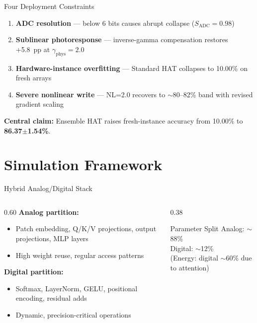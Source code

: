 \documentclass[aspectratio=169,11pt]{beamer}
\begin{document}
\begin{frame}{Four Deployment Constraints}
  \begin{enumerate}
    \item \textbf{ADC resolution} --- below 6 bits causes abrupt collapse ($S_{\text{ADC}} = 0.98$)
    \item \textbf{Sublinear photoresponse} --- inverse-gamma compensation restores +5.8~pp at $\gamma_{\text{phys}} = 2.0$
    \item \textbf{Hardware-instance overfitting} --- Standard HAT collapses to 10.00\% on fresh arrays
    \item \textbf{Severe nonlinear write} --- NL=2.0 recovers to $\sim$80--82\% band with revised gradient scaling
  \end{enumerate}
  \vfill
  \centering
  \textbf{Central claim:} Ensemble HAT raises fresh-instance accuracy from 10.00\% to \textbf{86.37$\pm$1.54\%}.
\end{frame}

\section{Simulation Framework}

\begin{frame}{Hybrid Analog/Digital Stack}
  \begin{columns}
    \begin{column}{0.60\textwidth}
      \textbf{Analog partition:}
      \begin{itemize}
        \item Patch embedding, Q/K/V projections, output projections, MLP layers
        \item High weight reuse, regular access patterns
      \end{itemize}
      \textbf{Digital partition:}
      \begin{itemize}
        \item Softmax, LayerNorm, GELU, positional encoding, residual adds
        \item Dynamic, precision-critical operations
      \end{itemize}
    \end{column}
    \begin{column}{0.38\textwidth}
      \begin{block}{Parameter Split}
        Analog: $\sim$88\%\\
        Digital: $\sim$12\%\\
        (Energy: digital $\sim$60\% due to attention)
      \end{block}
    \end{column}
  \end{columns}
\end{frame}
\end{document}
